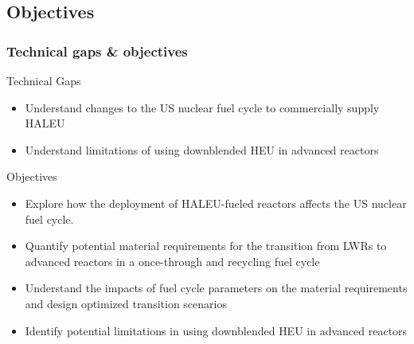 \subsection{Objectives}
\begin{frame}
    \frametitle{Technical gaps \& objectives}
    \begin{block}{Technical Gaps}
        \begin{itemize}
            \item Understand changes to the US nuclear fuel cycle to 
                  commercially supply \gls{HALEU}
            \item Understand limitations of using downblended \gls{HEU} 
                  in advanced reactors         
        \end{itemize}
    \end{block}
    \pause
    \begin{block}{Objectives}
        \begin{itemize}
        \item<2-> Explore how the deployment of \gls{HALEU}-fueled reactors 
        affects the US nuclear fuel cycle. 
        \item<2-> Quantify potential material requirements for the transition from 
              \glspl{LWR} to advanced reactors in a once-through and recycling 
              fuel cycle
        \item<2-> Understand the impacts of fuel cycle parameters on the 
              material requirements and design optimized transition scenarios
        \item<2-> Identify potential limitations in using downblended \gls{HEU} 
              in advanced reactors
        \end{itemize}
    \end{block}
\end{frame}
